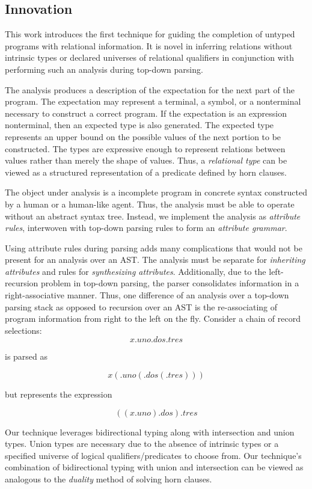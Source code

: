 \documentclass[sigplan,screen,review]{acmart}
\begin{document}
\subsection{Innovation}
This work introduces the first technique for guiding the completion of untyped programs with relational information. 
It is novel in inferring relations without intrinsic types or declared universes of relational qualifiers 
in conjunction with performing such an analysis during top-down parsing.

The analysis produces a description of the expectation for the next part of the program.
The expectation may represent a terminal, a symbol, or 
a nonterminal necessary to construct a correct program. If the expectation is an expression 
nonterminal, then an expected type is also generated. The expected type represents an upper bound
on the possible values of the next portion to be constructed. The types are expressive enough to represent relations 
between values rather than merely the shape of values. Thus, a \textit{relational type} can be viewed 
as a structured representation of a predicate defined by horn clauses. 

The object under analysis is a incomplete program in concrete syntax constructed by a human or a human-like agent. 
Thus, the analysis must be able to operate without an abstract syntax tree. Instead, we implement the analysis 
as \textit{attribute rules}, interwoven with top-down parsing rules to form an \textit{attribute grammar}. 

Using attribute rules during parsing adds many complications that would not be present for an
analysis over an AST. 
The analysis must be separate for \textit{inheriting attributes} and rules for \textit{synthesizing attributes}.
Additionally, due to the left-recursion problem in top-down parsing, 
the parser consolidates information in a right-associative manner.
Thus, one difference of an analysis over a top-down parsing stack as opposed to recursion over an AST is 
the re-associating of program information from right to the left on the fly. 
Consider a chain of record selections:  
\[ 
x.uno.dos.tres 
\]

\noindent is parsed as

\[ 
x(.uno(.dos(.tres)))
\]

\noindent but represents the expression 

\[ 
((x.uno).dos).tres
\]

Our technique leverages bidirectional typing along with intersection and union types. Union types are necessary due to
the absence of intrinsic types or a specified universe of logical qualifiers/predicates to choose from. 
Our technique's combination of bidirectional typing with union and intersection can be viewed as analogous to the \textit{duality} method
of solving horn clauses.
\end{document}
